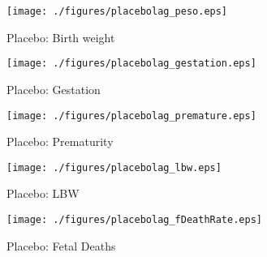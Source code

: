 \documentclass[10pt,letterpaper,subeqn,table]{beamer}
\begin{document}
\begin{frame}[label=allPlaceboBW]
\begin{figure}[htpb!]
  \begin{center}
  \centering
  \caption{Placebo: Birth weight}
  \texttt{[image: ./figures/placebolag\_peso.eps]}
\end{center}
\end{figure}
\footnotesize{\hyperlink{Placebo}{}}
\end{frame}

\begin{frame}[label=allPlaceboGest]
\begin{figure}[htpb!]
  \begin{center}
  \centering
  \caption{Placebo: Gestation}
  \texttt{[image: ./figures/placebolag\_gestation.eps]}
\end{center}
\end{figure}
\footnotesize{\hyperlink{Placebo}{}}
\end{frame}

\begin{frame}[label=allPlaceboPrem]
\begin{figure}[htpb!]
  \begin{center}
  \centering
  \caption{Placebo: Prematurity}
  \texttt{[image: ./figures/placebolag\_premature.eps]}
\end{center}
\end{figure}
\footnotesize{\hyperlink{Placebo}{}}
\end{frame}

\begin{frame}[label=allPlaceboLBW]
\begin{figure}[htpb!]
  \begin{center}
  \centering
  \caption{Placebo: LBW}
  \texttt{[image: ./figures/placebolag\_lbw.eps]}
\end{center}
\end{figure}
\footnotesize{\hyperlink{Placebo}{}}
\end{frame}

\begin{frame}[label=allPlaceboFD]
\begin{figure}[htpb!]
  \begin{center}
  \centering
  \caption{Placebo: Fetal Deaths}
  \texttt{[image: ./figures/placebolag\_fDeathRate.eps]}
\end{center}
\end{figure}
\footnotesize{\hyperlink{Placebo}{}}
\end{frame}
\end{document}
